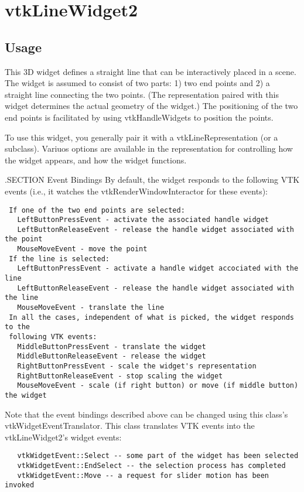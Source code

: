 \section{vtkLineWidget2}

\subsection{Usage}

 This 3D widget defines a straight line that can be interactively placed in
 a scene. The widget is assumed to consist of two parts: 1) two end points
 and 2) a straight line connecting the two points. (The representation
 paired with this widget determines the actual geometry of the widget.) The
 positioning of the two end points is facilitated by using vtkHandleWidgets
 to position the points.

 To use this widget, you generally pair it with a vtkLineRepresentation
 (or a subclass). Variuos options are available in the representation for 
 controlling how the widget appears, and how the widget functions.

 .SECTION Event Bindings
 By default, the widget responds to the following VTK events (i.e., it
 watches the vtkRenderWindowInteractor for these events):
 \begin{verbatim}
 If one of the two end points are selected:
   LeftButtonPressEvent - activate the associated handle widget
   LeftButtonReleaseEvent - release the handle widget associated with the point
   MouseMoveEvent - move the point
 If the line is selected:
   LeftButtonPressEvent - activate a handle widget accociated with the line 
   LeftButtonReleaseEvent - release the handle widget associated with the line
   MouseMoveEvent - translate the line
 In all the cases, independent of what is picked, the widget responds to the 
 following VTK events:
   MiddleButtonPressEvent - translate the widget
   MiddleButtonReleaseEvent - release the widget
   RightButtonPressEvent - scale the widget's representation
   RightButtonReleaseEvent - stop scaling the widget
   MouseMoveEvent - scale (if right button) or move (if middle button) the widget
 \end{verbatim}

 Note that the event bindings described above can be changed using this
 class's vtkWidgetEventTranslator. This class translates VTK events 
 into the vtkLineWidget2's widget events:
 \begin{verbatim}
   vtkWidgetEvent::Select -- some part of the widget has been selected
   vtkWidgetEvent::EndSelect -- the selection process has completed
   vtkWidgetEvent::Move -- a request for slider motion has been invoked
 \end{verbatim}

